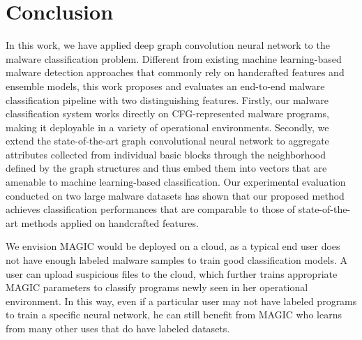 \section{Conclusion} \label{sec:conclusions}
In this work, we have applied deep graph convolution neural network to the malware classification problem.
Different from existing machine learning-based malware detection approaches that commonly rely on handcrafted features and ensemble models,
this work proposes and evaluates an end-to-end malware classification pipeline with two distinguishing features.
Firstly, our malware classification system works directly on CFG-represented malware programs, making it deployable in a variety of operational environments.
Secondly, we extend the state-of-the-art graph convolutional neural network to aggregate attributes collected from individual basic blocks through the neighborhood defined by the graph structures and thus embed them into vectors that are amenable to machine learning-based classification.
Our experimental evaluation conducted on two large malware datasets has shown that our proposed method achieves classification performances that are comparable to those of state-of-the-art methods applied on handcrafted features.

We envision MAGIC would be deployed on a cloud, as a typical end user does not have enough labeled malware samples to train good classification models.
A user can upload suspicious files to the cloud, which further trains appropriate MAGIC parameters to classify programs newly seen in her operational environment.
In this way, even if a particular user may not have labeled programs to train a specific neural network, he can still benefit from MAGIC who learns from many other uses that do have labeled datasets.


